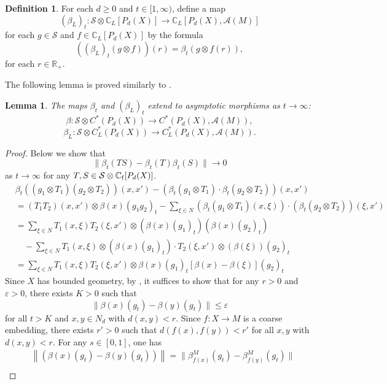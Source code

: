 \documentclass{article}
\theoremstyle{plain}
\newtheorem{lemma}[theorem]{Lemma}
\theoremstyle{definition}
\newtheorem{definition}[theorem]{Definition}
\theoremstyle{remark}
\def\A{\mathcal A}
\def\IR{\mathbb R}
\def\IC{\mathbb C}
\def\S{\mathcal S}
\begin{document}
	\begin{definition}
		For each $d\geq 0$ and $t\in[1,\infty)$, define a map
		$$(\beta_L)_t:\S\otimes\IC_{L}[P_d(X)]\to\IC_{L}[P_d(X),\A(M)]$$
		for each $g\in\S$ and $f\in\IC_{L}[P_d(X)]$ by the formula
		$$((\beta_L)_t(g\otimes f))(r)=\beta_t(g\otimes f(r)),$$
		for each $r\in\IR_+$.
	\end{definition}
	
	The following lemma is proved similarly to \cite[Lemma 4.9]{guo2024hilbert}.
	\begin{lemma}\label{bottasym}
		The maps $\beta_t$ and $(\beta_L)_t$ extend to asymptotic morphisms as $t\rightarrow \infty$:
		$$\beta:\S\otimes C^*(P_d(X))\to C^*(P_d(X),\A(M)),$$
		$$\beta_L:\S\otimes C^*_L(P_d(X))\to C^*_L(P_d(X),\A(M)).$$
	\end{lemma}
	\begin{proof}
		Below we show that
		$$\|\beta_t(TS)-\beta_t(T)\beta_t(S)\|\to 0$$
		as $t\to\infty$ for any $T,S\in\S\otimes\mathbb C_{\rm f}[P_d(X)]$.
		\begin{equation*}
			\begin{aligned}
				&\beta_{t}((g_{1}\otimes T_{1})(g_{2}\otimes T_{2}))(x,x')-(\beta_{t}(g_{1}\otimes T_{1})\cdot\beta_{t}(g_{2}\otimes T_{2}))(x,x')\\
				&=(T_{1}T_{2})(x,x')\otimes \beta(x)(g_{1}g_{2})_{t} -\sum_{\xi\in N}
				(\beta_{t}(g_{1}\otimes T_{1})(x,\xi))\cdot (\beta_{t}(g_{2}\otimes T_{2}))(\xi,x')\\
				&=\sum_{\xi\in N}T_{1}(x,\xi)T_{2}(\xi,x')\otimes (\beta(x)(g_{1})_{t})(\beta(x)(g_{2})_{t})\\
				&\quad-\sum_{\xi\in N}T_{1}(x,\xi)\otimes (\beta(x)(g_{1})_{t}) \cdot T_{2}(\xi,x')
				\otimes (\beta(\xi))(g_{2})_{t}\\
				&=\sum_{\xi\in N}T_{1}(x,\xi)T_{2}(\xi,x')\otimes \beta(x)(g_{1})_{t}
				[\beta(x)-\beta(\xi)](g_{2})_{t}
			\end{aligned}
		\end{equation*}
		Since $X$ has bounded geometry, by \cite[Lemma~3.4]{gong2008geometrization}, it suffices to show that for any $r>0$ and $\varepsilon>0$, there exists $K>0$ such that
		$$\|\beta(x)(g_t)-\beta(y)(g_t)\|\leq \varepsilon$$
		for all $t>K$ and $x,y\in N_d$ with $d(x,y)<r$. Since $f: X\to M$ is a coarse embedding, there exists $r'>0$ such that $d(f(x),f(y))<r'$ for all $x,y$ with $d(x,y)<r$.
		For any $s\in[0,1]$, one has
		\[\begin{split}&\left\|\left(\beta(x)(g_t)-\beta(y)(g_t)\right)\right\|=\|\beta_{f(x)}^M(g_t)-\beta^{M}_{f(y)}(g_t)\|\\

\end{split}\]
\end{proof}
\end{document}
